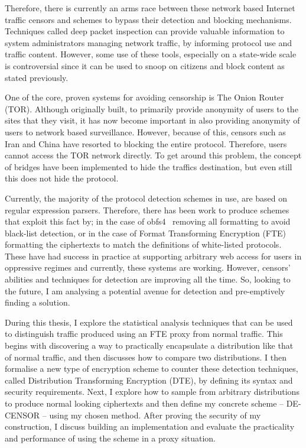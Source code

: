 \documentclass[ %
                    author={Samuel Russell},
                supervisor={Prof. Bogdan Warinschi},
                    degree={MEng},
                     title={Innocuous Ciphertexts},
                  subtitle={The DE-CENSOR Scheme},
                      type={research},
                      year={2018} ]{dissertation}
\begin{document}
Therefore, there is currently an arms race between these network based Internet traffic censors and schemes to bypass their detection and blocking mechanisms.
Techniques called deep packet inspection can provide valuable information to system administrators managing network traffic, by informing protocol use and traffic content.
However, some use of these tools, especially on a state-wide scale is controversial since it can be used to snoop on citizens and block content as stated previously.

One of the core, proven systems for avoiding censorship is The Onion Router (TOR).
Although originally built, to primarily provide anonymity of users to the sites that they visit, it has now become important in also providing anonymity of users to network based surveillance.
However, because of this, censors such as Iran and China have resorted to blocking the entire protocol.
Therefore, users cannot access the TOR network directly.
To get around this problem, the concept of bridges have been implemented to hide the traffics destination, but even still this does not hide the protocol.

Currently, the majority of the protocol detection schemes in use, are based on regular expression parsers.
Therefore, there has been work to produce schemes that exploit this fact by; in the case of obfs4~\cite{obfs4} removing all formatting to avoid black-list detection, or in the case of Format Transforming Encryption (FTE) formatting the ciphertexts to match the definitions of white-listed protocols.
These have had success in practice at supporting arbitrary web access for users in oppressive regimes and currently, these systems are working.
However, censors' abilities and techniques for detection are improving all the time. So, looking to the future, I am analysing a potential avenue for detection and pre-emptively finding a solution.

During this thesis, I explore the statistical analysis techniques that can be used to distinguish traffic produced using an FTE proxy from normal traffic.
This begins with discovering a way to practically encapsulate a distribution like that of normal traffic, and then discusses how to compare two distributions.
I then formalise a new type of encryption scheme to counter these detection techniques, called Distribution Transforming Encryption (DTE), by defining its syntax and security requirements.
Next, I explore how to sample from arbitrary distributions to produce normal looking ciphertexts and then define my concrete scheme -- DE-CENSOR -- using my chosen method. 
After proving the security of my construction, I discuss building an implementation and evaluate the practicality and performance of using the scheme in a proxy situation.
\end{document}
